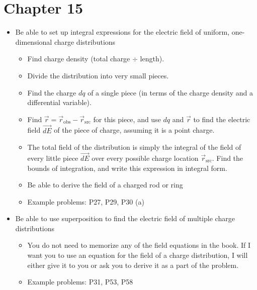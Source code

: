 \documentclass{article}
\begin{document}
\section*{Chapter 15}
\begin{itemize}
	\item Be able to set up integral expressions for the electric field of uniform, one-dimensional charge distributions
	\begin{itemize}
		\item Find charge density (total charge $\div$ length).
		\item Divide the distribution into very small pieces.
		\item Find the charge $dq$ of a single piece (in terms of the charge density and a differential variable).
		\item Find $\vec{r}=\vec{r}_\mathrm{obs}-\vec{r}_\mathrm{src}$ for this piece, and use $dq$ and $\vec{r}$ to find the electric field $\vec{dE}$ of the piece of charge, assuming it is a point charge.
		\item The total field of the distribution is simply the integral of the field of every little piece $\vec{dE}$ over every possible charge location $\vec{r}_\mathrm{src}$. Find the bounds of integration, and write this expression in integral form.
		\item Be able to derive the field of a charged rod or ring
		\item Example problems: P27, P29, P30 (a)
	\end{itemize}
	\item Be able to use superposition to find the electric field of multiple charge distributions
	\begin{itemize}
		\item You do not need to memorize any of the field equations in the book. If I want you to use an equation for the field of a charge distribution, I will either give it to you or ask you to derive it as a part of the problem.
		\item Example problems: P31, P53, P58
	\end{itemize}
\end{itemize}
\end{document}
